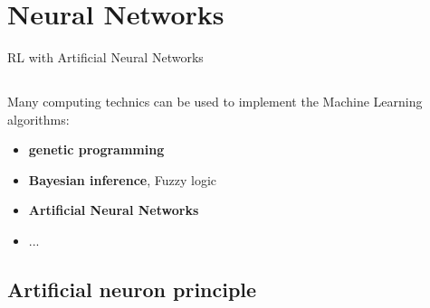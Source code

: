\documentclass[12pt,serif,mathserif,compress]{beamer}
\begin{document}
\section{Neural Networks}

\begin{frame}{RL with Artificial Neural Networks}

  \subsection*{}

  Many computing technics can be used to implement the Machine Learning algorithms:
    \begin{itemize}
    \item <1-> \textbf{genetic programming}
    \item <1-> \textbf{Bayesian inference}, Fuzzy logic
    \item <1-> \textbf{Artificial Neural Networks}
    \item <1-> ...
    \end{itemize}    

    \bigskip
\end{frame}

\subsection*{Artificial neuron principle}
\end{document}
